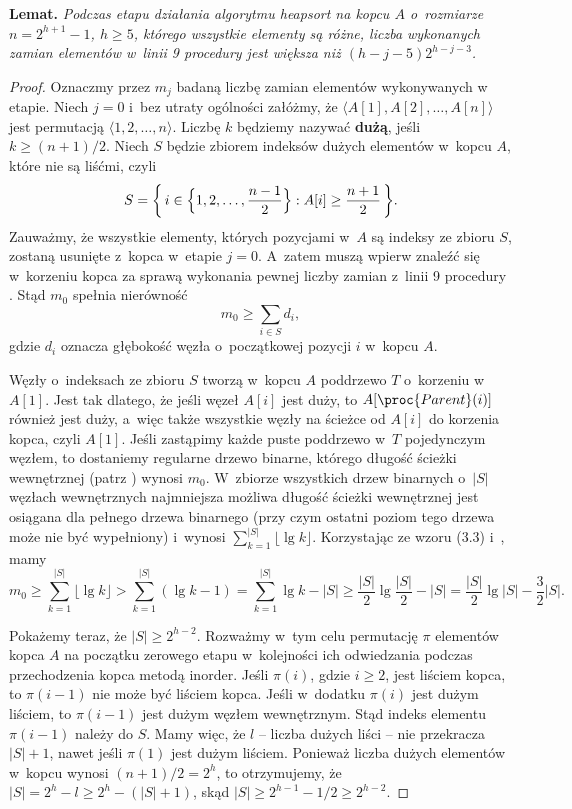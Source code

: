 \medskip
\noindent\textsf{\textbf{Lemat.}} \textit{Podczas\/  etapu działania algorytmu heapsort na kopcu\/ $A$ o~rozmiarze\/ $n=2^{h+1}-1$,\/ $h\ge5$, którego wszystkie elementy są różne, liczba wykonanych zamian elementów w~linii 9 procedury  jest większa niż\/ $(h-j-5)2^{h-j-3}$.}
\begin{proof}
Oznaczmy przez $m_j$ badaną liczbę zamian elementów wykonywanych w~ etapie.
Niech $j=0$ i~bez utraty ogólności załóżmy, że $\langle A[1],A[2],\dots,A[n]\rangle$ jest permutacją $\langle1,2,\dots,n\rangle$.
Liczbę $k$ będziemy nazywać \textbf{dużą}, jeśli $k\ge(n+1)/2$.
Niech $S$ będzie zbiorem indeksów dużych elementów w~kopcu $A$, które nie są liśćmi, czyli
\[
    S = \biggl\{\,i\in\Bigl\{1,2,\dots,\frac{n-1}{2}\Bigr\}:A[i]\ge\frac{n+1}{2}\,\biggr\}.
\]
Zauważmy, że wszystkie elementy, których pozycjami w~$A$ są indeksy ze zbioru $S$, zostaną usunięte z~kopca w~etapie $j=0$.
A~zatem muszą wpierw znaleźć się w~korzeniu kopca za sprawą wykonania pewnej liczby zamian z~linii 9 procedury .
Stąd $m_0$ spełnia nierówność
\[
    m_0 \ge \sum_{i\in S}d_i,
\]
gdzie $d_i$ oznacza głębokość węzła o~początkowej pozycji $i$ w~kopcu $A$.

Węzły o~indeksach ze zbioru $S$ tworzą w~kopcu $A$ poddrzewo $T$ o~korzeniu w~$A[1]$.
Jest tak dlatego, że jeśli węzeł $A[i]$ jest duży, to $A[\proc{Parent}(i)]$ również jest duży, a~więc także wszystkie węzły na ścieżce od $A[i]$ do korzenia kopca, czyli $A[1]$.
Jeśli zastąpimy każde puste poddrzewo w~$T$ pojedynczym węzłem, to dostaniemy regularne drzewo binarne, którego długość ścieżki wewnętrznej (patrz ) wynosi $m_0$.
W~zbiorze wszystkich drzew binarnych o~$|S|$ węzłach wewnętrznych najmniejsza możliwa długość ścieżki wewnętrznej jest osiągana dla pełnego drzewa binarnego (przy czym ostatni poziom tego drzewa może nie być wypełniony) i~wynosi $\sum_{k=1}^{|S|}\lfloor\lg k\rfloor$.
Korzystając ze wzoru (3.3) i~, mamy
\[
    m_0 \ge \sum_{k=1}^{|S|}\lfloor\lg k\rfloor > \sum_{k=1}^{|S|}(\lg k-1) = \sum_{k=1}^{|S|}\lg k-|S| \ge \frac{|S|}{2}\lg\frac{|S|}{2}-|S| = \frac{|S|}{2}\lg|S|-\frac{3}{2}|S|.
\]

Pokażemy teraz, że $|S|\ge2^{h-2}$.
Rozważmy w~tym celu permutację $\pi$ elementów kopca $A$ na początku zerowego etapu w~kolejności ich odwiedzania podczas przechodzenia kopca metodą inorder.
Jeśli $\pi(i)$, gdzie $i\ge2$, jest liściem kopca, to $\pi(i-1)$ nie może być liściem kopca.
Jeśli w~dodatku $\pi(i)$ jest dużym liściem, to $\pi(i-1)$ jest dużym węzłem wewnętrznym.
Stąd indeks elementu $\pi(i-1)$ należy do $S$.
Mamy więc, że $l$ -- liczba dużych liści -- nie przekracza $|S|+1$, nawet jeśli $\pi(1)$ jest dużym liściem.
Ponieważ liczba dużych elementów w~kopcu wynosi $(n+1)/2=2^h$, to otrzymujemy, że $|S|=2^h-l\ge2^h-(|S|+1)$, skąd $|S|\ge2^{h-1}-1/2\ge2^{h-2}$.


\end{proof}
